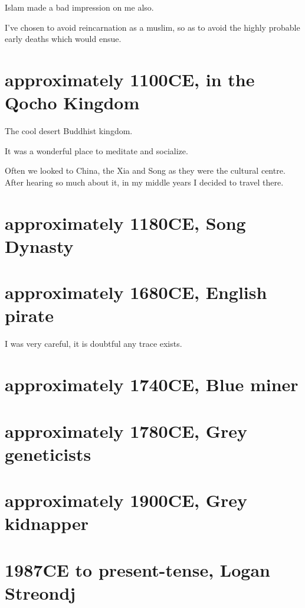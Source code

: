 Islam made a bad impression on me also. 

I've chosen to avoid reincarnation as a muslim, so as to avoid the highly
probable early deaths which would ensue. 

\chapter{approximately 1100CE, in the Qocho Kingdom}
The cool desert Buddhist kingdom.

It was a wonderful place to meditate and socialize. 

Often we looked to China, the Xia and Song as they were the cultural centre. 
After hearing so much about it, in my middle years I decided to travel there.

\chapter{approximately 1180CE, Song Dynasty}

\chapter{approximately 1680CE, English pirate}

I was very careful, it is doubtful any trace exists. 

\chapter{approximately 1740CE, Blue miner}
\chapter{approximately 1780CE, Grey geneticists}
\chapter{approximately 1900CE, Grey kidnapper}
\chapter{1987CE to present-tense, Logan Streondj}
